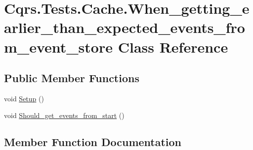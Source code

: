 \hypertarget{classCqrs_1_1Tests_1_1Cache_1_1When__getting__earlier__than__expected__events__from__event__store}{}\section{Cqrs.\+Tests.\+Cache.\+When\+\_\+getting\+\_\+earlier\+\_\+than\+\_\+expected\+\_\+events\+\_\+from\+\_\+event\+\_\+store Class Reference}
\label{classCqrs_1_1Tests_1_1Cache_1_1When__getting__earlier__than__expected__events__from__event__store}
\subsection*{Public Member Functions}
\begin{DoxyCompactItemize}
\item 
void \hyperlink{classCqrs_1_1Tests_1_1Cache_1_1When__getting__earlier__than__expected__events__from__event__store_ab095ffc0bb04e65b5aa2c08acb56c4f6_ab095ffc0bb04e65b5aa2c08acb56c4f6}{Setup} ()
\item 
void \hyperlink{classCqrs_1_1Tests_1_1Cache_1_1When__getting__earlier__than__expected__events__from__event__store_a906e06ee908a7ba5220b2986e34fac27_a906e06ee908a7ba5220b2986e34fac27}{Should\+\_\+get\+\_\+events\+\_\+from\+\_\+start} ()
\end{DoxyCompactItemize}


\subsection{Member Function Documentation}
\mbox{\label{classCqrs_1_1Tests_1_1Cache_1_1When__getting__earlier__than__expected__events__from__event__store_ab095ffc0bb04e65b5aa2c08acb56c4f6_ab095ffc0bb04e65b5aa2c08acb56c4f6}} 
